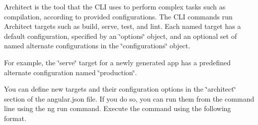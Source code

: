 Architect is the tool that the CLI uses to perform complex tasks such as compilation, according to provided configurations. The CLI commands run Architect targets such as {\ttfamily build}, {\ttfamily serve}, {\ttfamily test}, and {\ttfamily lint}. Each named target has a default configuration, specified by an \char`\"{}options\char`\"{} object, and an optional set of named alternate configurations in the \char`\"{}configurations\char`\"{} object.

For example, the \char`\"{}serve\char`\"{} target for a newly generated app has a predefined alternate configuration named \char`\"{}production\char`\"{}.

You can define new targets and their configuration options in the \char`\"{}architect\char`\"{} section of the {\ttfamily angular.\+json} file. If you do so, you can run them from the command line using the {\ttfamily ng run} command. Execute the command using the following format.


\begin{DoxyCode}{0}

\end{DoxyCode}
 